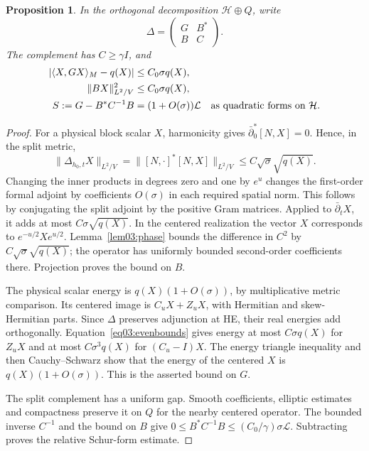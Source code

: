 \documentclass[11pt]{amsart}
\newtheorem{proposition}[theorem]{Proposition}
\theoremstyle{definition}
\theoremstyle{remark}
\newcommand{\HH}{\mathcal H}
\newcommand{\db}{\bar\partial}
\begin{document}
\begin{proposition}\label{prop03:schur}
In the orthogonal decomposition \(\HH\oplus Q\), write
\begin{equation}\label{eq03:blocks}
 \Delta=\begin{pmatrix}G&B^*\\ B&C\end{pmatrix}.
\end{equation}
The complement has \(C\ge\gamma I\), and
\begin{equation}\label{eq03:blockbounds}
 \begin{aligned}
 |\langle X,GX\rangle_M-q(X)|&\le C_0\sigma q(X),\\
 \|BX\|_{L^2/V}^2&\le C_0\sigma q(X),\\
 S:=G-B^*C^{-1}B&=(1+O(\sigma))\mathcal L
                       \quad\hbox{as quadratic forms on }\HH.
 \end{aligned}
\end{equation}
\end{proposition}

\begin{proof}
For a physical block scalar \(X\), harmonicity gives
\(\db_0^*[N,X]=0\). Hence, in the split metric,
\[
 \|\Delta_{h_0,t}X\|_{L^2/V}
 =\|[N,\cdot]^*[N,X]\|_{L^2/V}
 \le C\sqrt\sigma\sqrt{q(X)}.
\]
Changing the inner products in degrees zero and one by \(e^u\)
changes the first-order formal adjoint by coefficients \(O(\sigma)\)
in each required spatial norm. This follows by conjugating the split
adjoint by the positive Gram matrices. Applied to \(\db_tX\),
it adds at most \(C\sigma\sqrt{q(X)}\). In the centered realization
the vector \(X\) corresponds to \(e^{-u/2}Xe^{u/2}\).
Lemma~\ref{lem03:phase} bounds the difference in \(C^2\) by
\(C\sqrt\sigma\sqrt{q(X)}\); the operator has uniformly bounded
second-order coefficients there. Projection proves the bound on \(B\).

The physical scalar energy is \(q(X)(1+O(\sigma))\), by multiplicative
metric comparison. Its centered image is \(C_uX+Z_uX\), with
Hermitian and skew-Hermitian parts. Since \(\Delta\) preserves
adjunction at HE, their real energies add orthogonally.
Equation~\eqref{eq03:evenbounds} gives energy at most
\(C\sigma q(X)\) for \(Z_uX\) and at most \(C\sigma^3q(X)\)
for \((C_u-I)X\). The energy triangle inequality and then
Cauchy--Schwarz show that the energy of the centered \(X\) is
\(q(X)(1+O(\sigma))\). This is the asserted bound on \(G\).

The split complement has a uniform gap. Smooth coefficients, elliptic
estimates and compactness preserve it on \(Q\) for the nearby
centered operator. The bounded inverse \(C^{-1}\) and the bound on
\(B\) give
\(0\le B^*C^{-1}B\le(C_0/\gamma)\sigma\mathcal L\).
Subtracting proves the relative Schur-form estimate.
\end{proof}
\end{document}
